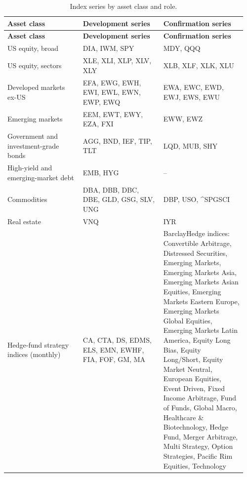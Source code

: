 {\scriptsize\setlength{\tabcolsep}{4pt}\renewcommand{\arraystretch}{1.2}
\begin{longtable}{@{}>{\raggedright\arraybackslash}p{0.305\linewidth}>{\raggedright\arraybackslash}p{0.321\linewidth}>{\raggedright\arraybackslash}p{0.335\linewidth}@{}}
\caption{Index series by asset class and role.}\label{tab:A1}\\
\toprule
\textbf{Asset class} & \textbf{Development series} & \textbf{Confirmation series} \\
\midrule
\endfirsthead
\toprule
\textbf{Asset class} & \textbf{Development series} & \textbf{Confirmation series} \\
\midrule
\endhead
\bottomrule
\endlastfoot
US equity, broad & DIA, IWM, SPY & MDY, QQQ \\
US equity, sectors & XLE, XLI, XLP, XLV, XLY & XLB, XLF, XLK, XLU \\
Developed markets ex-US & EFA, EWG, EWH, EWI, EWL, EWN, EWP, EWQ & EWA, EWC, EWD, EWJ, EWS, EWU \\
Emerging markets & EEM, EWT, EWY, EZA, FXI & EWW, EWZ \\
Government and investment-grade bonds & AGG, BND, IEF, TIP, TLT & LQD, MUB, SHY \\
High-yield and emerging-market debt & EMB, HYG & -- \\
Commodities & DBA, DBB, DBC, DBE, GLD, GSG, SLV, UNG & DBP, USO, \textasciicircum{}SPGSCI \\
Real estate & VNQ & IYR \\
Hedge-fund strategy indices (monthly) & CA, CTA, DS, EDMS, ELS, EMN, EWHF, FIA, FOF, GM, MA & BarclayHedge indices: Convertible Arbitrage, Distressed Securities, Emerging Markets, Emerging Markets Asia, Emerging Markets Asian Equities, Emerging Markets Eastern Europe, Emerging Markets Global Equities, Emerging Markets Latin America, Equity Long Bias, Equity Long/Short, Equity Market Neutral, European Equities, Event Driven, Fixed Income Arbitrage, Fund of Funds, Global Macro, Healthcare \& Biotechnology, Hedge Fund, Merger Arbitrage, Multi Strategy, Option Strategies, Pacific Rim Equities, Technology \\
\end{longtable}}
